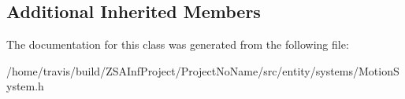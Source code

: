 \subsection*{Additional Inherited Members}


The documentation for this class was generated from the following file\-:\begin{DoxyCompactItemize}
\item 
/home/travis/build/\-Z\-S\-A\-Inf\-Project/\-Project\-No\-Name/src/entity/systems/Motion\-System.\-h\end{DoxyCompactItemize}

